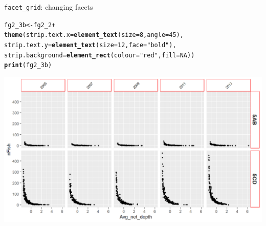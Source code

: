 \documentclass{beamer}\usepackage[]{graphicx}\usepackage[]{color}
\makeatletter
\newcommand{\hlnum}[1]{\textcolor[rgb]{0.686,0.059,0.569}{#1}}%
\newcommand{\hlstr}[1]{\textcolor[rgb]{0.192,0.494,0.8}{#1}}%
\newcommand{\hlopt}[1]{\textcolor[rgb]{0,0,0}{#1}}%
\newcommand{\hlstd}[1]{\textcolor[rgb]{0.345,0.345,0.345}{#1}}%
\newcommand{\hlkwb}[1]{\textcolor[rgb]{0.69,0.353,0.396}{#1}}%
\newcommand{\hlkwc}[1]{\textcolor[rgb]{0.333,0.667,0.333}{#1}}%
\newcommand{\hlkwd}[1]{\textcolor[rgb]{0.737,0.353,0.396}{\textbf{#1}}}%
\newenvironment{kframe}{%
 \def\at@end@of@kframe{}%
 \ifinner\ifhmode%
  \def\at@end@of@kframe{\end{minipage}}%
  \begin{minipage}{\columnwidth}%
 \fi\fi%
 \def\FrameCommand##1{\hskip\@totalleftmargin \hskip-\fboxsep
 \colorbox{shadecolor}{##1}\hskip-\fboxsep
     \hskip-\linewidth \hskip-\@totalleftmargin \hskip\columnwidth}%
 \MakeFramed {\advance\hsize-\width
   \@totalleftmargin\z@ \linewidth\hsize
   \@setminipage}}%
 {\par\unskip\endMakeFramed%
 \at@end@of@kframe}
\newenvironment{knitrout}{}{} %
\makeatother
\begin{document}
\begin{frame}[fragile]{\lstinline{facet_grid}: changing facets}
\begin{knitrout}\footnotesize
{}\color{fgcolor}\begin{kframe}
\begin{alltt}
\hlstd{fg2_3b} \hlkwb{<-} \hlstd{fg2_2} \hlopt{+}
  \hlkwd{theme}\hlstd{(}\hlkwc{strip.text.x} \hlstd{=} \hlkwd{element_text}\hlstd{(}\hlkwc{size}\hlstd{=}\hlnum{8}\hlstd{,} \hlkwc{angle}\hlstd{=}\hlnum{45}\hlstd{),}
        \hlkwc{strip.text.y} \hlstd{=} \hlkwd{element_text}\hlstd{(}\hlkwc{size}\hlstd{=}\hlnum{12}\hlstd{,} \hlkwc{face}\hlstd{=}\hlstr{"bold"}\hlstd{),}
        \hlkwc{strip.background} \hlstd{=} \hlkwd{element_rect}\hlstd{(}\hlkwc{colour}\hlstd{=}\hlstr{"red"}\hlstd{,} \hlkwc{fill}\hlstd{=}\hlnum{NA}\hlstd{))}
\hlkwd{print}\hlstd{(fg2_3b)}
\end{alltt}
\end{kframe}

{\centering \includegraphics[width=.9\linewidth]{figure/facet_grid_10-1} 

}



\end{knitrout}
\end{frame}

\end{document}
